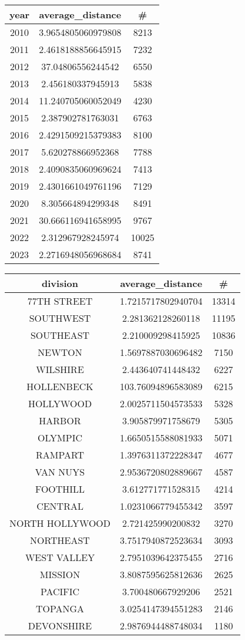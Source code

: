 \documentclass{article}
\begin{document}
\begin{center}
\begin{tabular}{|c|c|c|}
\hline
\textbf{year} & \textbf{average\_distance} & \textbf{\#} \\
\hline
2010 & 3.9654805060979808 & 8213 \\
2011 & 2.4618188856645915 & 7232 \\
2012 & 37.04806556244542 & 6550 \\
2013 & 2.456180337945913 & 5838 \\
2014 & 11.240705060052049 & 4230 \\
2015 & 2.387902781763031 & 6763 \\
2016 & 2.4291509215379383 & 8100 \\
2017 & 5.620278866952368 & 7788 \\
2018 & 2.4090835060969624 & 7413 \\
2019 & 2.4301661049761196 & 7129 \\
2020 & 8.305664894299348 & 8491 \\
2021 & 30.666116941658995 & 9767 \\
2022 & 2.312967928245974 & 10025 \\
2023 & 2.2716948056968684 & 8741 \\
\hline
\end{tabular}
\quad
\begin{tabular}{|c|c|c|}
\hline
\textbf{division} & \textbf{average\_distance} & \textbf{\#} \\
\hline
77TH STREET & 1.7215717802940704 & 13314 \\
SOUTHWEST & 2.281362128260118 & 11195 \\
SOUTHEAST & 2.210009298415925 & 10836 \\
NEWTON & 1.5697887030696482 & 7150 \\
WILSHIRE & 2.443640741448432 & 6227 \\
HOLLENBECK & 103.76094896583089 & 6215 \\
HOLLYWOOD & 2.0025711504573533 & 5328 \\
HARBOR & 3.905879971758679 & 5305 \\
OLYMPIC & 1.6650515588081933 & 5071 \\
RAMPART & 1.3976311372228347 & 4677 \\
VAN NUYS & 2.9536720802889667 & 4587 \\
FOOTHILL & 3.612771771528315 & 4214 \\
CENTRAL & 1.0231066779455342 & 3597 \\
NORTH HOLLYWOOD & 2.721425990200832 & 3270 \\
NORTHEAST & 3.7517940872523634 & 3093 \\
WEST VALLEY & 2.7951039642375455 & 2716 \\
MISSION & 3.8087595625812636 & 2625 \\
PACIFIC & 3.700480667929206 & 2521 \\
TOPANGA & 3.0254147394551283 & 2146 \\
DEVONSHIRE & 2.9876944488748034 & 1180 \\
\hline
\end{tabular}
\end{center} 
\end{document}
